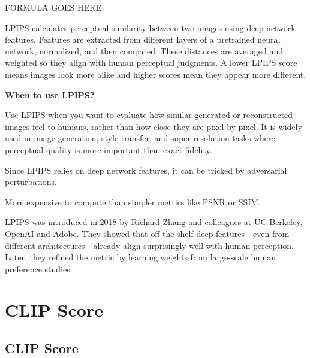 \begin{center}
    FORMULA GOES HERE
\end{center}

LPIPS calculates perceptual similarity between two images using deep network features. Features are extracted from different layers of a
pretrained neural network, normalized, and then compared. These distances are averaged and weighted so they align with human perceptual judgments.
A lower LPIPS score means images look more alike and higher scores mean they appear more different.

\textbf{When to use LPIPS?}

Use LPIPS when you want to evaluate how similar generated or reconstructed images feel to humans, rather than how close they are pixel by pixel.
It is widely used in image generation, style transfer, and super-resolution tasks where perceptual quality is more important than exact fidelity.

{
\item Since LPIPS relies on deep network features, it can be tricked by adversarial perturbations.
\item More expensive to compute than simpler metrics like PSNR or SSIM.
}

\clearpage

\thispagestyle{customstyle}

{LPIPS was introduced in 2018 by Richard Zhang and colleagues at UC Berkeley, OpenAI and Adobe. They showed that off-the-shelf deep features—even
from different architectures—already align surprisingly well with human perception. Later, they refined the metric by learning weights from
large-scale human preference studies.}


\clearpage
\thispagestyle{genaistyle}
\section{CLIP Score}
\subsection{CLIP Score}

